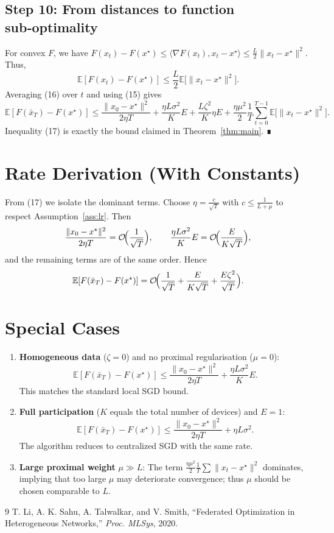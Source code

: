 \documentclass[11pt]{article}
\begin{document}
\subsection*{Step 10: From distances to function sub‑optimality}
For convex $F$, we have $F(x_t)-F(x^\star)\le \langle \nabla F(x_t),x_t-x^\star\rangle\le \frac{L}{2}\|x_t-x^\star\|^2$.
Thus,
\[
\mathbb{E}[F(x_t)-F(x^\star)]\le \frac{L}{2}\mathbb{E}\!\bigl[\|x_t-x^\star\|^2\bigr]. \tag{16}
\]
Averaging (16) over $t$ and using (15) gives
\[
\mathbb{E}[F(\bar x_T)-F(x^\star)]
\le \frac{\|x_0-x^\star\|^2}{2\eta T}
+ \frac{\eta L\sigma^2}{K}E
+ \frac{L\zeta^2}{K}\eta E
+ \frac{\eta\mu^2}{2}\frac1T\sum_{t=0}^{T-1}\mathbb{E}\!\bigl[\|x_t-x^\star\|^2\bigr] .
\tag{17}
\]
Inequality (17) is exactly the bound claimed in Theorem~\ref{thm:main}. ∎

\section*{Rate Derivation (With Constants)}
From (17) we isolate the dominant terms.  
Choose $\eta = \frac{c}{\sqrt{T}}$ with $c\le \frac{1}{L+\mu}$ to respect Assumption~\ref{ass:lr}. Then
\[
\frac{\|x_0-x^\star\|^2}{2\eta T}= \mathcal{O}\!\Bigl(\frac{1}{\sqrt{T}}\Bigr),\qquad
\frac{\eta L\sigma^2}{K}E = \mathcal{O}\!\Bigl(\frac{E}{K\sqrt{T}}\Bigr),
\]
and the remaining terms are of the same order. Hence
\[
\mathbb{E}[F(\bar x_T)-F(x^\star)] = \mathcal{O}\!\Bigl(\frac{1}{\sqrt{T}}+\frac{E}{K\sqrt{T}}+\frac{E\zeta^2}{\sqrt{T}}\Bigr).
\]

\section*{Special Cases}
\begin{enumerate}[label=(\alph*)]
    \item \textbf{Homogeneous data} ($\zeta=0$) and no proximal regularisation ($\mu=0$):
    \[
    \mathbb{E}[F(\bar x_T)-F(x^\star)]\le
    \frac{\|x_0-x^\star\|^2}{2\eta T}
    +\frac{\eta L\sigma^2}{K}E .
    \]
    This matches the standard local SGD bound.
    \item \textbf{Full participation} ($K$ equals the total number of devices) and $E=1$:
    \[
    \mathbb{E}[F(\bar x_T)-F(x^\star)]\le
    \frac{\|x_0-x^\star\|^2}{2\eta T}
    +\eta L\sigma^2 .
    \]
    The algorithm reduces to centralized SGD with the same rate.
    \item \textbf{Large proximal weight} $\mu\gg L$:
    The term $\frac{\eta\mu^2}{2}\frac1T\sum\|x_t-x^\star\|^2$ dominates, implying that too large $\mu$ may deteriorate convergence; thus $\mu$ should be chosen comparable to $L$.
\end{enumerate}

\begin{thebibliography}{9}
T. Li, A. K. Sahu, A. Talwalkar, and V. Smith, ``Federated Optimization in Heterogeneous Networks,'' \emph{Proc. MLSys}, 2020.
\end{thebibliography}
\end{document}
